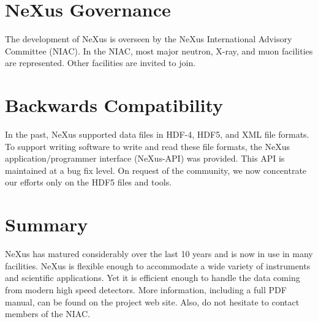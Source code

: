 \documentclass[%
 aip,
rsi,
 amsmath,amssymb,
 reprint,%
]{revtex4-1}
\begin{document}
\section{NeXus Governance}

The development of NeXus is overseen by the NeXus International Advisory Committee (NIAC).
In the NIAC, most major neutron, X-ray, and muon facilities are represented.
Other facilities are invited to join.

\section{Backwards Compatibility}

In the past, NeXus supported data files in HDF-4, HDF5, and XML file formats. 
To support writing software to write and read these file formats, the NeXus
application/programmer interface (NeXus-API) was provided.
This API is maintained at a bug fix level.
On request of the community, we now concentrate our efforts only
on the HDF5 files and tools.

\section{Summary}

NeXus has matured considerably over the last 10 years and is now in use in many facilities. NeXus 
is flexible enough to accommodate a wide variety of instruments and scientific applications. 
Yet it is efficient enough to 
handle the data coming from modern high speed detectors.
More information, including a full PDF manual, can be found on
  the project web site.\cite{nxwww}
Also, do not hesitate to contact members of the NIAC.


\nocite{*}
\end{document}
